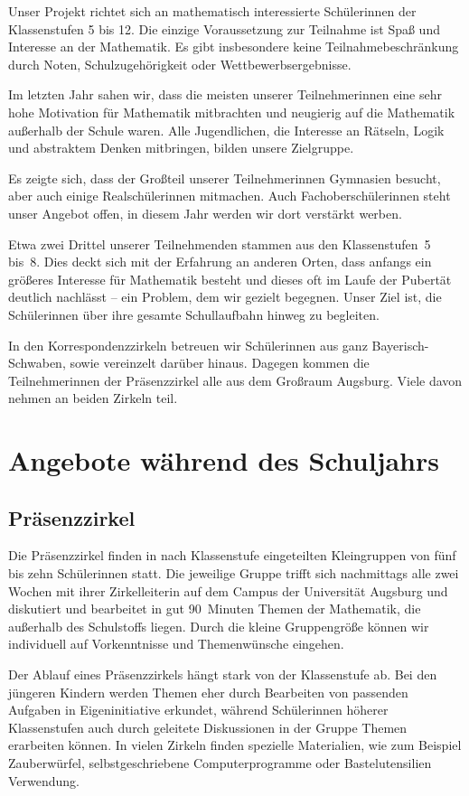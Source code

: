 \documentclass[12pt]{zettel}
\begin{document}
Unser Projekt richtet sich an mathematisch interessierte Schülerinnen
der Klassenstufen 5 bis 12. Die einzige Voraussetzung zur
Teilnahme ist Spaß und Interesse an der Mathematik. Es gibt insbesondere
keine Teilnahmebeschränkung durch Noten, Schulzugehörigkeit oder
Wettbewerbsergebnisse.

Im letzten Jahr sahen wir, dass die meisten unserer Teilnehmerinnen eine
sehr hohe Motivation für Mathematik mitbrachten und neugierig auf die
Mathematik außerhalb der Schule waren. Alle Jugendlichen, die Interesse an
Rätseln, Logik und abstraktem Denken mitbringen, bilden unsere
Zielgruppe.

Es zeigte sich, dass der Großteil unserer Teilnehmerinnen Gymnasien besucht, aber auch einige Realschülerinnen mitmachen.
Auch Fachoberschülerinnen steht unser Angebot offen, in diesem Jahr werden wir dort verstärkt werben.

Etwa zwei Drittel unserer Teilnehmenden
stammen aus den Klassenstufen~5 bis~8.
Dies deckt sich mit der
Erfahrung an anderen Orten, dass anfangs ein größeres Interesse für
Mathematik besteht und dieses oft im Laufe der Pubertät
deutlich nachlässt -- ein Problem, dem wir gezielt begegnen. Unser Ziel ist, die Schülerinnen über ihre gesamte Schullaufbahn hinweg zu begleiten.

In den Korrespondenzzirkeln betreuen wir Schülerinnen aus ganz Bayerisch-Schwaben, sowie vereinzelt darüber hinaus. Dagegen kommen die Teilnehmerinnen
der Prä\-senz\-zir\-kel alle aus dem Großraum Augsburg. Viele davon
nehmen an beiden Zirkeln teil.


\section{Angebote während des Schuljahrs}

\subsection{Präsenzzirkel}

Die Präsenzzirkel finden in nach Klassenstufe eingeteilten
Kleingruppen von fünf bis zehn Schülerinnen statt.
Die jeweilige Gruppe trifft sich nachmittags alle zwei Wochen mit ihrer Zirkelleiterin auf dem Campus der Universität Augsburg und diskutiert und
bearbeitet in gut 90~Minuten Themen der Mathematik, die außerhalb des
Schulstoffs liegen. Durch die kleine Gruppengröße können wir individuell auf
Vorkenntnisse und Themenwünsche eingehen.

Der Ablauf eines Präsenzzirkels hängt stark von der Klassenstufe ab. Bei den
jüngeren Kindern werden Themen eher durch Bearbeiten von passenden
Aufgaben in Eigeninitiative erkundet, während Schülerinnen höherer
Klassenstufen auch durch geleitete Diskussionen in der Gruppe
Themen erarbeiten können. In vielen Zirkeln finden spezielle Materialien,
wie zum Beispiel Zauberwürfel, selbstgeschriebene Computerprogramme oder
Bastelutensilien Verwendung.
\end{document}
